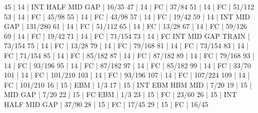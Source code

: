 45    |  14    |        INT  HALF            MID  GAP         | 16/35   
47    |  14    |    FC                                        | 37/84   
51    |  14    |    FC                                        | 51/112   
53    |  14    |    FC                                        | 45/98   
55    |  14    |    FC                                        | 43/98   
57    |  14    |    FC                                        | 19/42   
59    |  14    |        INT                  MID  GAP         | 131/280   
61    |  14    |    FC                                        | 51/112   
65    |  14    |    FC                                        | 13/28   
67    |  14    |    FC                                        | 59/126   
69    |  14    |    FC                                        | 19/42   
71    |  14    |    FC                                        | 71/154   
73    |  14    |    FC  INT                  MID  GAP  TRAIN  | 73/154   
75    |  14    |    FC                                        | 13/28   
79    |  14    |    FC                                        | 79/168   
81    |  14    |    FC                                        | 73/154   
83    |  14    |    FC                                        | 71/154   
85    |  14    |    FC                                        | 85/182   
87    |  14    |    FC                                        | 87/182   
89    |  14    |    FC                                        | 79/168   
93    |  14    |    FC                                        | 93/196   
95    |  14    |    FC                                        | 87/182   
97    |  14    |    FC                                        | 85/182   
99    |  14    |    FC                                        | 33/70   
101   |  14    |    FC                                        | 101/210   
103   |  14    |    FC                                        | 93/196   
107   |  14    |    FC                                        | 107/224   
109   |  14    |    FC                                        | 101/210   
16    |  15    |                   EBM                        | 1/3   
17    |  15    |        INT        EBM  HBM  MID              | 7/20   
19    |  15    |                             MID  GAP         | 7/20   
22    |  15    |    FC             EBM                        | 1/3   
23    |  15    |    FC                                        | 23/60   
26    |  15    |        INT  HALF            MID  GAP         | 37/90   
28    |  15    |    FC                                        | 17/45   
29    |  15    |    FC                                        | 16/45   
